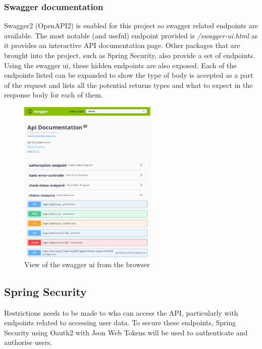 \subsubsection{Swagger documentation}
Swagger2 (OpenAPI2) is enabled for this project so swagger related endpoints are available.
The most notable (and useful) endpoint provided is \textit{/swagger-ui.html} as it provides an interactive API documentation page.
Other packages that are brought into the project, such as Spring Security, also provide a set of endpoints. 
Using the swagger ui, these hidden endpoints are also exposed.
Each of the endpoints listed can be expanded to show the type of body is accepted as a part of the request and lists all the potential 
returns types and what to expect in the response body for each of them.

\begin{figure}[ht]
    \centering
    \includegraphics[width=250px]{images/swagger-ui.png}
    \caption{View of the swagger ui from the browser}
    \label{swaggerui}
\end{figure}

\clearpage
\subsection{Spring Security}

Restrictions needs to be made to who can access the API, particularly with endpoints related to accessing user data.
To secure these endpoints, Spring Security using Oauth2 with Json Web Tokens will be used to authenticate and authorise users.




